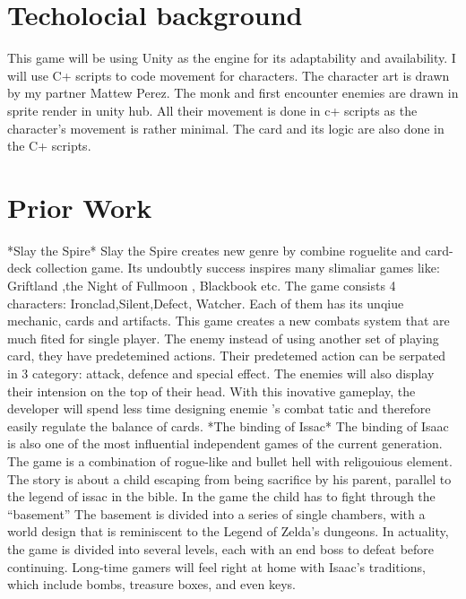 \documentclass[10pt,twocolumn]{article}
\begin{document}
\section{Techolocial background}

This game will be using Unity as the engine for its adaptability and availability. I will use C+ scripts to code movement for characters. The character art is drawn by my partner Mattew Perez. The monk and first encounter enemies are drawn in sprite render in unity hub. All their movement is done in c+ scripts as the character’s movement is rather minimal. The card and its logic are also done in the C+ scripts.


\section{Prior Work  }
*Slay the Spire*
Slay the Spire creates new genre by combine roguelite and card-deck collection game. Its undoubtly success inspires many slimaliar games like: Griftland ,the Night of Fullmoon , Blackbook etc. The game consists 4 characters: Ironclad,Silent,Defect, Watcher. Each of them has its unqiue mechanic, cards and artifacts. This game creates a new combats system that are much fited for single player. The enemy instead of using another set of playing card, they have predetemined actions. Their predetemed action can be serpated in 3 category: attack, defence and special effect. The enemies will also display their intension on the top of their head. With this inovative gameplay, the developer will spend less time designing enemie 's combat tatic and therefore easily regulate the balance of cards.
*The binding of Issac*
	The binding of Isaac is also one of the most influential independent games of the current generation. The game is a combination of rogue-like and bullet hell with religouious element. The story is about a child escaping from being sacrifice by his parent, parallel to the legend of issac in the bible. In the game the child has to fight through the “basement”  The basement is divided into a series of single chambers, with a world design that is reminiscent to the Legend of Zelda's dungeons. In actuality, the game is divided into several levels, each with an end boss to defeat before continuing. Long-time gamers will feel right at home with Isaac's traditions, which include bombs, treasure boxes, and even keys.
 
\end{document}
